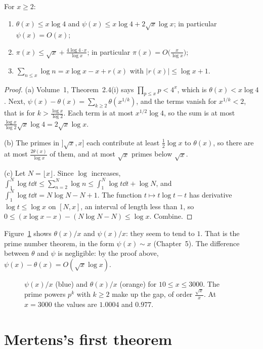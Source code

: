 \begin{proposition}\label{prop:chebyshev}
For $x\ge2$:
\begin{enumerate}[label=(\alph*)]
\item $\theta(x)\le x\log4$ and $\psi(x)\le x\log4+2\sqrt x\log x$; in particular $\psi(x)=O(x)$;
\item $\pi(x)\le\sqrt x+\frac{4\log4\cdot x}{\log x}$; in particular $\pi(x)=O\bigl(\frac x{\log x}\bigr)$;
\item $\displaystyle\sum_{n\le x}\log n=x\log x-x+r(x)$ with $|r(x)|\le\log x+1$.
\end{enumerate}
\end{proposition}
\begin{proof}
(a) Volume~1, Theorem~2.4(i) says $\prod_{p\le x}p<4^x$, which is $\theta(x)<x\log4$. Next, $\psi(x)-\theta(x)=\sum_{k\ge2}\theta(x^{1/k})$, and the terms vanish
for $x^{1/k}<2$, that is for $k>\frac{\log x}{\log2}$. Each term is at most $x^{1/2}\log4$, so the sum is at most $\frac{\log x}{\log2}\sqrt x\log4=2\sqrt x\log x$.

(b) The primes in $]\sqrt x,x]$ each contribute at least $\frac12\log x$ to $\theta(x)$, so there are at most $\frac{2\theta(x)}{\log x}$ of them, and at most $\sqrt x$
primes below $\sqrt x$.

(c) Let $N=\lfloor x\rfloor$. Since $\log$ increases, $\int_1^N\log t\dd t\le\sum_{n=2}^N\log n\le\int_1^N\log t\dd t+\log N$, and $\int_1^N\log t\dd t=N\log N-N+1$. The function
$t\mapsto t\log t-t$ has derivative $\log t\le\log x$ on $[N,x]$, an interval of length less than $1$, so $0\le(x\log x-x)-(N\log N-N)\le\log x$. Combine.
\end{proof}

Figure~\ref{fig:chebyshev} shows $\theta(x)/x$ and $\psi(x)/x$: they seem to tend to $1$. That is the prime number theorem, in the form
$\psi(x)\sim x$ (Chapter~5). The difference between $\theta$ and $\psi$ is negligible: by the proof above, $\psi(x)-\theta(x)=O(\sqrt x\log x)$.

\begin{figure}[ht]
\centering
{}
\caption{$\psi(x)/x$ (blue) and $\theta(x)/x$ (orange) for $10\le x\le3000$. The prime powers $p^k$ with $k\ge2$ make up the gap, of order $\frac{\sqrt x}x$.
At $x=3000$ the values are $1.0004$ and $0.977$.}
\label{fig:chebyshev}
\end{figure}

\section{Mertens's first theorem}

